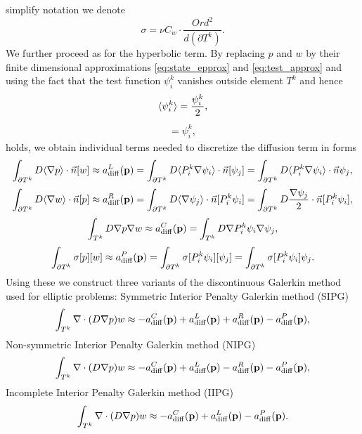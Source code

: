 simplify notation
we denote
\begin{equation}
\label{eq:diff_penalty_sigma}
\sigma = \nu C_w \cdot \frac{Ord^2}{d(\partial T^k)}.
\end{equation}
We further proceed as for the hyperbolic term. By replacing $p$ and $w$ by their
finite dimensional approximations \eqref{eq:state_epprox} and
\eqref{eq:test_approx} and using the fact that the test function $\psi^k_i$
vanishes outside element $T^k$ and hence
\begin{eqnarray}
\langle\psi^k_i\rangle = \frac{\psi^k_i}{2},
\end{eqnarray}
\begin{eqnarray}
[\psi^k_i] = \psi^k_i,
\end{eqnarray}
holds, we obtain individual terms needed to discretize the diffusion term in forms
\begin{equation}
\label{eq:diff_left_approx}
\int_{\partial T^k} D \langle\nabla p\rangle \cdot \vec{n} [w]
\approx
a^L_\mathrm{diff}(\mathbf{p}) =
\int_{\partial T^k} D \langle P^k_i\nabla\psi_i\rangle \cdot \vec{n}[\psi_j] =
\int_{\partial T^k} D \langle P^k_i\nabla\psi_i\rangle \cdot \vec{n}\psi_j,
\end{equation}
\begin{equation}
\label{eq:diff_right_approx}
\int_{\partial T^k} D \langle\nabla w \rangle\cdot \vec{n} [p]
\approx
a^R_\mathrm{diff}(\mathbf{p}) =
\int_{\partial T^k} D \langle\nabla \psi_j \rangle\cdot \vec{n} [P^k_i\psi_i] =
\int_{\partial T^k} D \frac{\nabla \psi_j}{2}\cdot \vec{n}
[P^k_i\psi_i],
\end{equation}
\begin{equation}
\label{eq:diff_laplace_approx}
\int_{T^k} D\nabla p \nabla w
\approx
a^C_\mathrm{diff}(\mathbf{p})=
\int_{T^k} D\nabla P^k_i\psi_i \nabla \psi_j,
\end{equation}
\begin{equation}
\label{eq:diff_penalty_approx}
\int_{\partial T^k} \sigma [p][w]
\approx
a^P_\mathrm{diff}(\mathbf{p})=
\int_{\partial T^k} \sigma [P^k_i\psi_i][\psi_j]
= \int_{\partial T^k} \sigma [P^k_i\psi_i]\psi_j.
\end{equation}
Using these we construct three variants of the discontinuous Galerkin method used for
elliptic problems: Symmetric Interior Penalty Galerkin method (SIPG)
\begin{equation}
\label{eq:sipg}
\int_{T^k}\nabla\cdot(D\nabla p) w \approx - a^C_\mathrm{diff}(\mathbf{p})
+ a^L_\mathrm{diff}(\mathbf{p}) + a^R_\mathrm{diff}(\mathbf{p})
- a^P_\mathrm{diff}(\mathbf{p}),
\end{equation}
Non-symmetric Interior Penalty Galerkin method (NIPG)
\begin{equation}
\label{eq:nipg}
\int_{T^k}\nabla\cdot(D\nabla p) w \approx - a^C_\mathrm{diff}(\mathbf{p})
+ a^L_\mathrm{diff}(\mathbf{p}) - a^R_\mathrm{diff}(\mathbf{p})
- a^P_\mathrm{diff}(\mathbf{p}),
\end{equation}
Incomplete Interior Penalty Galerkin method (IIPG)
\begin{equation}
\label{eq:iipg}
\int_{T^k}\nabla\cdot(D\nabla p) w \approx - a^C_\mathrm{diff}(\mathbf{p})
+ a^L_\mathrm{diff}(\mathbf{p})
- a^P_\mathrm{diff}(\mathbf{p}).
\end{equation}

